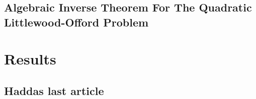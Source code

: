\documentclass[12pt]{article}
\begin{document}




\subsection{Algebraic Inverse Theorem For The
Quadratic Littlewood-Offord Problem}



\section{Results}

\subsection{Haddas last article}



\newpage
\printbibliography
\end{document}
